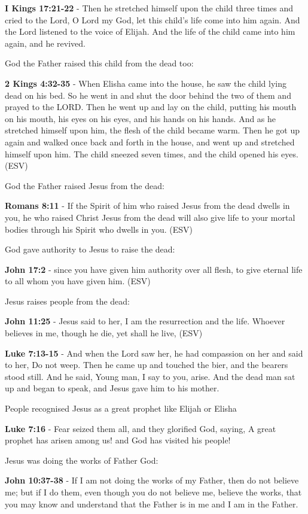 \documentclass[11pt]{article}
\begin{document}
\textbf{I Kings 17:21-22} - Then he stretched himself upon the child three times and cried to the Lord, O Lord my God, let this child's life come into him again. And the Lord listened to the voice of Elijah. And the life of the child came into him again, and he revived.

God the Father raised this child from the dead too:

\textbf{2 Kings 4:32-35} -  When Elisha came into the house, he saw the child lying dead on his bed.  So he went in and shut the door behind the two of them and prayed to the LORD.  Then he went up and lay on the child, putting his mouth on his mouth, his eyes on his eyes, and his hands on his hands.  And as he stretched himself upon him, the flesh of the child became warm.  Then he got up again and walked once back and forth in the house, and went up and stretched himself upon him. The child sneezed seven times, and the child opened his eyes.  (ESV)

God the Father raised Jesus from the dead:

\textbf{Romans 8:11} - If the Spirit of him who raised Jesus from the dead dwells in you, he who raised Christ Jesus from the dead will also give life to your mortal bodies through his Spirit who dwells in you. (ESV)

God gave authority to Jesus to raise the dead:

\textbf{John 17:2} - since you have given him authority over all flesh, to give eternal life to all whom you have given him. (ESV)

Jesus raises people from the dead:

\textbf{John 11:25} - Jesus said to her, I am the resurrection and the life. Whoever believes in me, though he die, yet shall he live, (ESV)

\textbf{Luke 7:13-15} - And when the Lord saw her, he had compassion on her and said to her, Do not weep. Then he came up and touched the bier, and the bearers stood still. And he said, Young man, I say to you, arise. And the dead man sat up and began to speak, and Jesus gave him to his mother.

People recognised Jesus as a great prophet like Elijah or Elisha

\textbf{Luke 7:16} - Fear seized them all, and they glorified God, saying, A great prophet has arisen among us! and God has visited his people!

Jesus was doing the works of Father God:

\textbf{John 10:37-38} - If I am not doing the works of my Father, then do not believe me; but if I do them, even though you do not believe me, believe the works, that you may know and understand that the Father is in me and I am in the Father.
\end{document}
